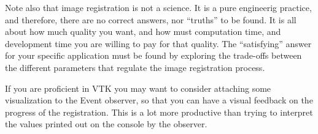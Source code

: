 Note also that image registration is not a science. It is a pure
engineerig practice, and therefore, there are no correct answers,
nor ``truths'' to be found. It is all about how much quality you want,
and how must computation time, and development time you are
willing to pay for that quality. The ``satisfying'' answer for your
specific application must be found by exploring the trade-offs
between the different parameters that regulate the image
registration process.

If you are proficient in VTK you may want to consider attaching
some visualization to the Event observer, so that you can have
a visual feedback on the progress of the registration. This is a
lot more productive than trying to interpret the values printed
out on the console by the observer.
